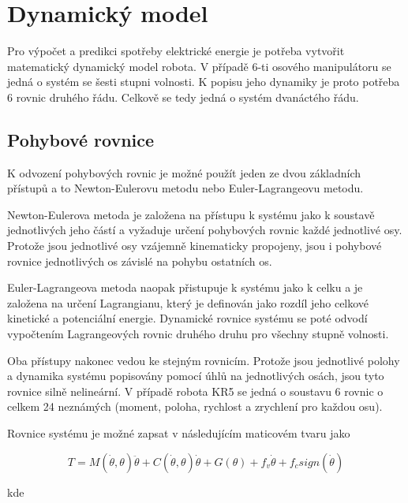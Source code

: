 

\chapter{Dynamický model}

Pro výpočet a predikci spotřeby elektrické energie je potřeba vytvořit matematický dynamický model robota. 
V případě 6-ti osového manipulátoru se jedná o systém se šesti stupni volnosti. K popisu jeho dynamiky je proto potřeba 6 rovnic druhého řádu. Celkově se tedy jedná o systém dvanáctého řádu. 

\section{Pohybové rovnice}

K odvození pohybových rovnic je možné použít jeden ze dvou základních přístupů a to Newton-Eulerovu metodu nebo Euler-Lagrangeovu metodu. 

Newton-Eulerova metoda je založena na přístupu k systému jako k soustavě jednotlivých jeho částí a vyžaduje určení pohybových rovnic každé jednotlivé osy. Protože jsou jednotlivé osy vzájemně kinematicky propojeny, jsou i pohybové rovnice jednotlivých os závislé na pohybu ostatních os. 

Euler-Lagrangeova metoda naopak přistupuje k systému jako k celku a je založena na určení Lagrangianu, který je definován jako rozdíl jeho celkové kinetické a potenciální energie. Dynamické rovnice systému se poté odvodí vypočtením Lagrangeových rovnic druhého druhu pro všechny stupně volnosti.

Oba přístupy nakonec vedou ke stejným rovnicím. Protože jsou jednotlivé polohy a dynamika systému popisovány pomocí úhlů na jednotlivých osách, jsou tyto rovnice silně nelineární. V případě robota KR5 se jedná o soustavu 6 rovnic o celkem 24 neznámých (moment, poloha, rychlost a zrychlení pro každou osu). 

Rovnice systému je možné zapsat v následujícím maticovém tvaru jako 

\begin{equation}
T = M(\dot{\theta},\theta)\ddot{\theta} + C(\dot{\theta},\theta)\dot{\theta} + G(\theta) + f_v\dot{\theta} + f_csign(\dot{\theta})
\label{dyn_rovnice_eq}
\end{equation}

kde

